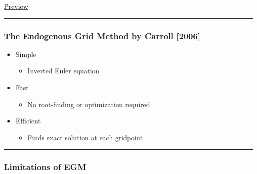 \documentclass[
  letterpaper,
  DIV=11,
  numbers=noendperiod]{scrartcl}
\providecommand{\tightlist}{%
  \setlength{\itemsep}{0pt}\setlength{\parskip}{0pt}}\usepackage{longtable,booktabs,array}
\begin{document}
\href{https://playground.tensorflow.org/}{Preview}

\begin{center}\rule{0.5\linewidth}{0.5pt}\end{center}

\hypertarget{the-endogenous-grid-method-by-carroll-2006}{%
\subsubsection{The Endogenous Grid Method by Carroll
{[}2006{]}}\label{the-endogenous-grid-method-by-carroll-2006}}

\begin{itemize}
\tightlist
\item
  Simple

  \begin{itemize}
  \tightlist
  \item
    Inverted Euler equation
  \end{itemize}
\item
  Fast

  \begin{itemize}
  \tightlist
  \item
    No root-finding or optimization required
  \end{itemize}
\item
  Efficient

  \begin{itemize}
  \tightlist
  \item
    Finds exact solution at each gridpoint
  \end{itemize}
\end{itemize}

\begin{center}\rule{0.5\linewidth}{0.5pt}\end{center}

\hypertarget{limitations-of-egm}{%
\subsubsection{Limitations of EGM}\label{limitations-of-egm}}
\end{document}
